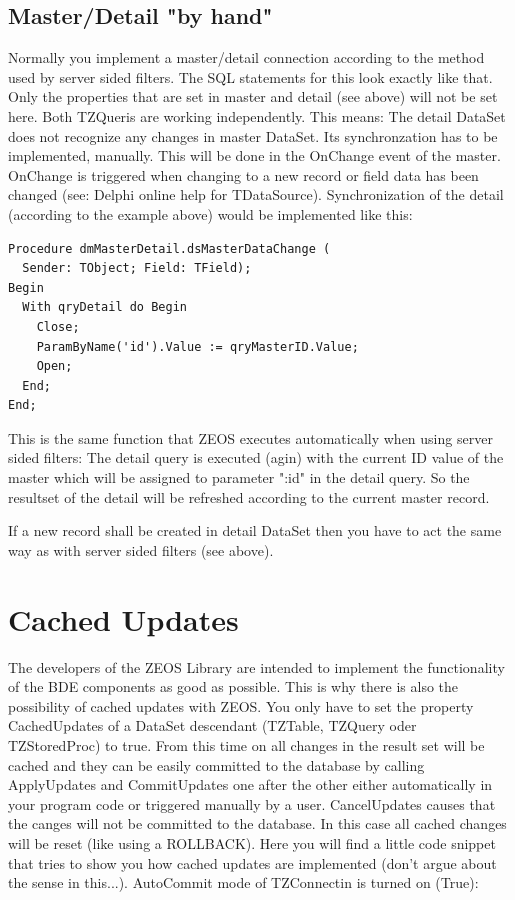 \documentclass[a4paper,12pt,oneside]{book}
\begin{document}
\subsection{Master/Detail "by hand"}
Normally you implement a master/detail connection according to the method used by server sided filters.
The SQL statements for this look exactly like that.
Only the properties that are set in master and detail (see above) will not be set here.
Both TZQueris are working independently.
This means: The detail DataSet does not recognize any changes in master DataSet.
Its synchronzation has to be implemented, manually.
This will be done in the OnChange event of the master.
OnChange is triggered when changing to a new record or field data has been changed (see: Delphi online help for TDataSource).
Synchronization of the detail (according to the example above) would be implemented like this:

\begin{verbatim}
Procedure dmMasterDetail.dsMasterDataChange (
  Sender: TObject; Field: TField);
Begin
  With qryDetail do Begin
    Close;
    ParamByName('id').Value := qryMasterID.Value;
    Open;
  End;
End;
\end{verbatim}

This is the same function that ZEOS executes automatically when using server sided filters:
The detail query is executed (agin) with the current ID value of the master which will be assigned to parameter ":id" in the detail query.
So the resultset of the detail will be refreshed according to the current master record.

If a new record shall be created in detail DataSet then you have to act the same way as with server sided filters (see above).

\section{Cached Updates}
The developers of the ZEOS Library are intended to implement the functionality of the BDE components as good as possible.
This is why there is also the possibility of cached updates with ZEOS.
You only have to set the property CachedUpdates of a DataSet descendant (TZTable, TZQuery oder TZStoredProc) to true.
From this time on all changes in the result set will be cached and they can be easily committed to the database by calling ApplyUpdates and CommitUpdates one after the other either automatically in your program code or triggered manually by a user.
CancelUpdates causes that the canges will not be committed to the database.
In this case all cached changes will be reset (like using a ROLLBACK).
Here you will find a little code snippet that tries to show you how cached updates are implemented (don't argue about the sense in this...).
AutoCommit mode of TZConnectin is turned on (True):
\end{document}
